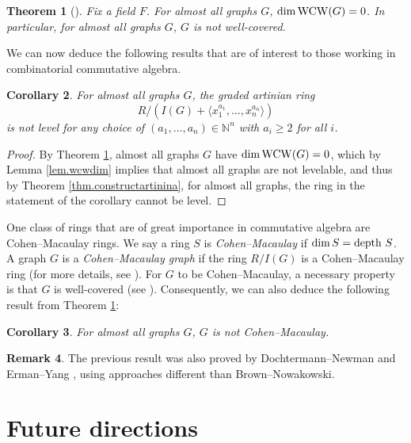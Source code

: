 \documentclass[12pt]{amsart}
\numberwithin{equation}{section}
\newtheorem{theorem}{Theorem}[section]
\newtheorem{corollary}[theorem]{Corollary}
\theoremstyle{definition}
\newtheorem{remark}[theorem]{Remark}
\newcounter{i} %
\begin{document}
\begin{theorem}[{\cite[Theorem 1; Corollary 2]{BN2007}}]\label{thm.almostall}  
Fix a field $F$. For almost all graphs $G$, $\dim {\rm WCW}(G) = 0$.
In particular, for almost all graphs $G$, $G$ is not well-covered.
\end{theorem}

We can now deduce the following results that are of interest to
those working in combinatorial commutative algebra.

\begin{corollary}\label{cor.neverlevel}
    For almost all graphs $G$, the graded artinian ring
    \[R/(I(G)+\langle x_1^{a_1},\ldots,x_n^{a_n}\rangle)\]
    is not level for any choice of $(a_1,\ldots,a_n) \in \mathbb{N}^n$
    with $a_i \geq 2$ for all $i$.
\end{corollary}

\begin{proof}
    By Theorem \ref{thm.almostall}, almost all graphs $G$
    have $\dim {\rm WCW}(G) = 0$, which by Lemma \ref{lem.wcwdim} 
    implies that almost all graphs are not levelable, and thus
    by Theorem \ref{thm.constructartinina}, for almost all graphs,
    the ring in the statement of the corollary cannot be level.
\end{proof}

One class of rings that are of great importance in commutative
algebra are Cohen--Macaulay rings.  We say a
ring $S$ is {\it Cohen--Macaulay} if
$\dim S = {\rm depth} ~S$.  A graph $G$ is a {\it Cohen--Macaulay
graph} if the ring $R/I(G)$ is a Cohen--Macaulay ring (for more details,
see \cite{HHgtm260}).
For $G$ to be Cohen--Macaulay, a necessary property is that $G$ is well-covered (see \cite[Lemma 9.1.10]{HHgtm260}).
Consequently, we can also deduce the following 
result from Theorem \ref{thm.almostall}:

\begin{corollary}\label{cor.nevercm}
    For almost all graphs $G$, $G$ is not Cohen--Macaulay.
\end{corollary}

\begin{remark}
    The previous result was also proved by
    Dochtermann--Newman \cite[Corollary 1.4]{DN2023} and 
    Erman--Yang \cite[Corollary 7.1]{EY2018}, using approaches different than Brown--Nowakowski.
\end{remark}

\section{Future directions}
\end{document}
